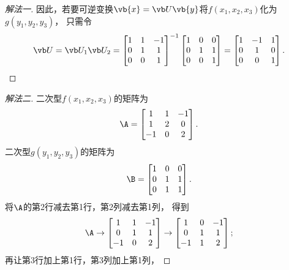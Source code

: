 \begin{example}
\begin{solution}
\begin{proof}[解法一]
因此，若要可逆变换\(\vb{x} = \P \vb{y}\)将\(f(x_1,x_2,x_3)\)化为\(g(y_1,y_2,y_3)\)，
只需令\begin{equation*}
	\P = \P_1 \P_2
	= \begin{bmatrix}
		1 & 1 & -1 \\
		0 & 1 & 1 \\
		0 & 0 & 1
	\end{bmatrix}^{-1}
	\begin{bmatrix}
		1 & 0 & 0 \\
		0 & 1 & 1 \\
		0 & 0 & 1
	\end{bmatrix}
	= \begin{bmatrix}
		1 & -1 & 1 \\
		0 & 1 & 0 \\
		0 & 0 & 1
	\end{bmatrix}.
\end{equation*}
\end{proof}
\begin{proof}[解法二]
二次型\(f(x_1,x_2,x_3)\)的矩阵为\begin{equation*}
	\A = \begin{bmatrix}
		1 & 1 & -1 \\
		1 & 2 & 0 \\
		-1 & 0 & 2
	\end{bmatrix}.
\end{equation*}
二次型\(g(y_1,y_2,y_3)\)的矩阵为\begin{equation*}
	\B = \begin{bmatrix}
		1 & 0 & 0 \\
		0 & 1 & 1 \\
		0 & 1 & 1
	\end{bmatrix}.
\end{equation*}
将\(\A\)的第2行减去第1行，第2列减去第1列，
得到\begin{equation*}
	\A \to \begin{bmatrix}
		1 & 1 & -1 \\
		0 & 1 & 1 \\
		-1 & 0 & 2
	\end{bmatrix}
	\to \begin{bmatrix}
		1 & 0 & -1 \\
		0 & 1 & 1 \\
		-1 & 1 & 2
	\end{bmatrix};
\end{equation*}
再让第3行加上第1行，第3列加上第1列，

\end{proof}
\end{solution}
\end{example}
